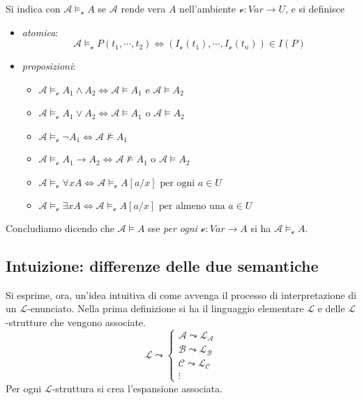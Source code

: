 \begin{defi}
Si indica con $\mathscr{A}\models_{\mathcal{v}} A$ se $\mathscr{A}$ rende vera $A$ nell'ambiente $\mathcal{v}: Var \rightarrow U$, e si definisce
\begin{itemize}
  \item \textit{atomica}:
  $$
  \mathscr{A} \models_{\mathcal{v}} P(t_1, \cdots, t_2) \iff (I_{\mathcal{v}}(t_1), \cdots, I_{\mathcal{v}}(t_n)) \in I(P)
  $$
  \item \textit{proposizioni}:
    \begin{itemize}
      \item  $\mathscr{A} \models_{\mathcal{v}} A_1 \land A_2 \iff \mathscr{A} \models A_1$ e $\mathscr{A} \models A_2$
      \item $\mathscr{A} \models_{\mathcal{v}}A_1 \lor A_2 \iff \mathscr{A} \models A_1$ o $\mathscr{A} \models A_2$
      \item $\mathscr{A} \models_{\mathcal{v}}  \neg A_1  \iff \mathscr{A} \nvDash A_1 $
      \item $\mathscr{A} \models_{\mathcal{v}} A_1 \rightarrow A_2 \iff \mathscr{A} \nvDash A_1$ o $\mathscr{A} \models A_2$
      \item $\mathscr{A} \models_{\mathcal{v}} \forall x A \iff \mathscr{A} \models_{\mathcal{v}} A[a/x] \text{ per ogni } a \in U$
      \item $\mathscr{A} \models_{\mathcal{v}} \exists x A \iff \mathscr{A} \models_{\mathcal{v}} A[a/x] \text{ per almeno una  } a \in U$
    \end{itemize}
\end{itemize}
Concludiamo dicendo che $\mathscr{A} \models A$ sse \textit{per ogni}  $\mathcal{v}: Var \rightarrow A$ si ha $\mathscr{A} \models_\mathcal{v} A$.
\end{defi}

\subsection{Intuizione: differenze delle due semantiche}
Si esprime, ora, un'idea intuitiva di come avvenga il processo di interpretazione 
di un $\mathscr{L}$-enunciato. Nella prima definizione si ha il linguaggio elementare $\mathscr{L}$ e delle 
$\mathscr{L}$-strutture che vengono associate. 
$$
\mathscr{L} \leadsto
\begin{cases}
        \mathscr{A}  \leadsto \mathscr{L}_{\mathscr{A}} \\
        \mathscr{B}  \leadsto \mathscr{L}_{\mathscr{B}} \\
        \mathscr{C}  \leadsto \mathscr{L}_{\mathscr{C}} \\
        \vdots 
\end{cases}
$$
Per ogni $\mathscr{L}$-struttura si crea l'espansione associata. 

